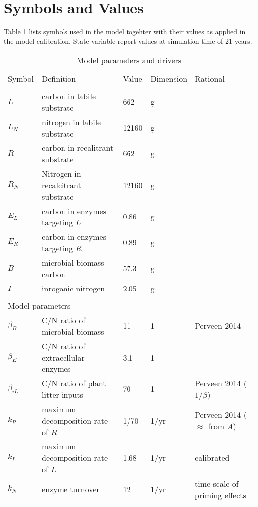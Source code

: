 \section{\\ \\ \hspace*{-7mm}  Symbols and Values \label{app:symbols}}    %

Table \ref{tab:modelParameters} lists symbols used in the model togehter with
their values as applied in the model calibration. State variable report values
at simulation time of 21 years. 

\begin{table}[t]
\caption{Model parameters and drivers \label{tab:modelParameters}}
\vskip4mm \centering
\begin{tabular}{lllll}
\tophline
Symbol &  Definition & Value & Dimension & Rational \\
\middlehline
\multicolumn{5}{l}{State variables}  \\
$L$ &  carbon in labile substrate & 662 & g &  \\
$L_N$ &  nitrogen in labile substrate & 12160 & g &  \\
$R$ &  carbon in recalitrant substrate & 662 & g &  \\
$R_N$ &  Nitrogen in recalcitrant substrate & 12160 & g &  \\
$E_L$ &  carbon in enzymes targeting $L$ & 0.86 & g &  \\
$E_R$ &  carbon in enzymes targeting $R$ & 0.89 & g &  \\
$B$ & microbial biomass carbon & 57.3 & g &  \\
$I$ & inroganic nitrogen & 2.05 & g &  \\
\\
\multicolumn{5}{l}{Model parameters}  \\
$\beta_B$ &  C/N ratio of microbial biomass & 11 & 1 & Perveen
2014 \\
$\beta_E$ &  C/N ratio of extracellular enzymes & 3.1 & 1 &
\citep{Sterner02} \\
$\beta_{iL}$ &  C/N ratio of plant litter inputs & 70 & 1 &
Perveen 2014 ($1/\beta$) \\
$k_R$ &  maximum decomposition rate of $R$ & 1/70 & 1/yr
& Perveen 2014 ($\approx$ from $A$) \\
$k_L$ &  maximum decomposition rate of $L$ &  1.68 & 1/yr
& calibrated \\
$k_N$ &  enzyme turnover &  12 & 1/yr & time scale of priming effects \\

\end{tabular}
\end{table}
